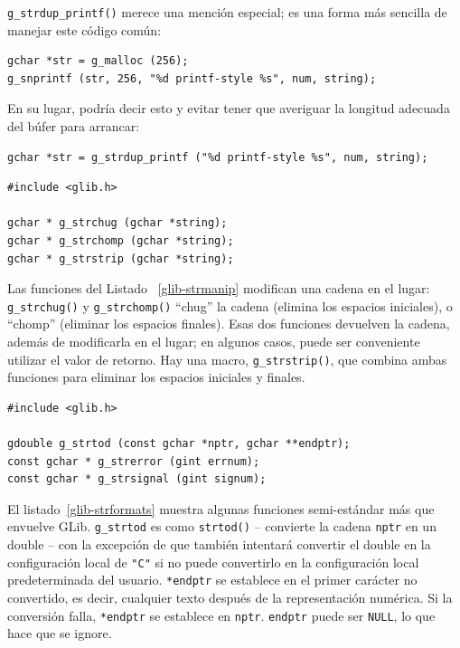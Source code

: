 \lstinline{g_strdup_printf()} merece una mención especial; es una forma más sencilla de manejar este código común:
\begin{lstlisting}[style=GLib/GTK]
gchar *str = g_malloc (256);
g_snprintf (str, 256, "%d printf-style %s", num, string);
\end{lstlisting}

En su lugar, podría decir esto y evitar tener que averiguar la longitud adecuada del búfer para arrancar:
\begin{lstlisting}[style=GLib/GTK]
gchar *str = g_strdup_printf ("%d printf-style %s", num, string);
\end{lstlisting}

\begin{lstlisting}[style=GLib/GTK, caption={Modificaciones de cadenas in situ}, label=glib-strmanip]
#include <glib.h>

gchar * g_strchug (gchar *string);
gchar * g_strchomp (gchar *string);
gchar * g_strstrip (gchar *string);
\end{lstlisting}

Las funciones del Listado ~\ref{glib-strmanip} modifican una cadena en el lugar: \lstinline{g_strchug()} y \lstinline{g_strchomp()} ``chug'' la cadena (elimina los espacios iniciales), o ``chomp'' (eliminar los espacios finales). Esas dos funciones devuelven la cadena, además de modificarla en el lugar; en algunos casos, puede ser conveniente utilizar el valor de retorno. Hay una macro, \lstinline{g_strstrip()}, que combina ambas funciones para eliminar los espacios iniciales y finales.

\begin{lstlisting}[style=GLib/GTK, caption={Conversiones de cadenas}, label=glib-strformats]
#include <glib.h>

gdouble g_strtod (const gchar *nptr, gchar **endptr);
const gchar * g_strerror (gint errnum);
const gchar * g_strsignal (gint signum);
\end{lstlisting}

El listado~\ref{glib-strformats} muestra algunas funciones semi-estándar más que envuelve GLib. \lstinline{g_strtod} es como \lstinline{strtod()} -- convierte la cadena \lstinline{nptr} en un double -- con la excepción de que también intentará convertir el double en la configuración local de \lstinline{"C"} si no puede convertirlo en la configuración local predeterminada del usuario. \lstinline{*endptr} se establece en el primer carácter no convertido, es decir, cualquier texto después de la representación numérica. Si la conversión falla, \lstinline{*endptr} se establece en \lstinline{nptr}. \lstinline{endptr} puede ser \lstinline{NULL}, lo que hace que se ignore.

